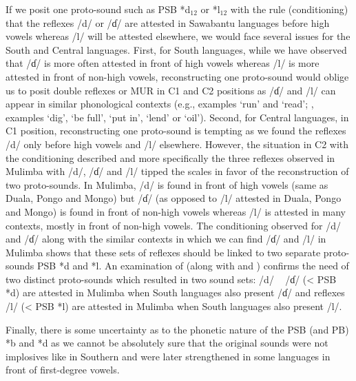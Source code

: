 \documentclass[output=paper,colorlinks,citecolor=brown
]{langscibook}
\begin{document}
If we posit one proto-sound such as PSB *d$_{12}$ or *l$_{12}$ with the rule (conditioning) that the reflexes /d/ or /ɗ/ are attested in Sawabantu languages before high vowels whereas /l/ will be attested elsewhere, we would face several issues for the South and Central languages. First, for South languages, while we have observed that /ɗ/ is more often attested in front of high vowels whereas /l/ is more attested in front of non-high vowels, reconstructing one proto-sound would oblige us to posit double reflexes or MUR in C1 and C2 positions as /ɗ/ and /l/ can appear in similar phonological contexts (e.g.,  examples `run' and `read'; , examples `dig', `be full', `put in', `lend' or `oil'). Second, for Central languages, in C1 position, reconstructing one proto-sound is tempting as we found the reflexes /d/ only before high vowels and /l/ elsewhere. However, the situation in C2 with the conditioning described and more specifically the three reflexes observed in Mulimba with /d/, /ɗ/ and /l/ tipped the scales in favor of the reconstruction of two proto-sounds. In Mulimba, /d/ is found in front of high vowels (same as Duala, Pongo and Mongo) but /ɗ/ (as opposed to /l/ attested in Duala, Pongo and Mongo) is found in front of non-high vowels whereas /l/ is attested in many contexts, mostly in front of non-high vowels. The conditioning observed for /d/ and /ɗ/ along with the similar contexts in which we can find /ɗ/ and /l/ in Mulimba shows that these sets of reflexes should be linked to two separate proto-sounds PSB *d and *l. An examination of  (along with  and ) confirms the need of two distinct proto-sounds which resulted in two sound sets: /d/ ~ /ɗ/ (< PSB *d) are attested in Mulimba when South languages also present /ɗ/ and reflexes /l/ (< PSB *l) are attested in Mulimba when South languages also present /l/.

Finally, there is some uncertainty as to the phonetic nature of the PSB (and PB) *b and *d as we cannot be absolutely sure that the original sounds were not implosives like in Southern and were later strengthened in some languages in front of first-degree vowels.
\end{document}
